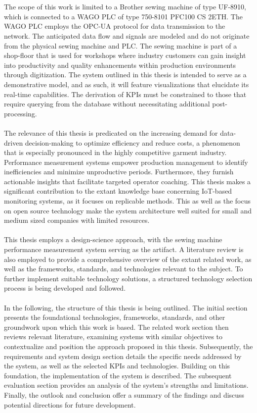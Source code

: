 \\\\
The scope of this work is limited to a Brother sewing machine of type UF-8910, which is connected to a WAGO PLC of type 750-8101 PFC100 CS 2ETH. The WAGO PLC employs the OPC-UA protocol for data transmission to the network. The anticipated data flow and signals are modeled and do not originate from the physical sewing machine and PLC. The sewing machine is part of a shop-floor that is used for workshops where industry customers can gain insight into productivity and quality enhancements within production environments through digitization. The system outlined in this thesis is intended to serve as a demonstrative model, and as such, it will feature visualizations that elucidate its real-time capabilities. The derivation of KPIs must be constrained to those that require querying from the database without necessitating additional post-processing.
\\\\
The relevance of this thesis is predicated on the increasing demand for data-driven decision-making to optimize efficiency and reduce costs, a phenomenon that is especially pronounced in the highly competitive garment industry. Performance measurement systems empower production management to identify inefficiencies and minimize unproductive periods. Furthermore, they furnish actionable insights that facilitate targeted operator coaching. This thesis makes a significant contribution to the extant knowledge base concerning IoT-based monitoring systems, as it focuses on replicable methods. This as well as the focus on open source technology make the system architecture well suited for small and medium sized companies with limited resources.
\\\\
This thesis employs a design-science approach, with the sewing machine performance measurement system serving as the artifact. A literature review is also employed to provide a comprehensive overview of the extant related work, as well as the frameworks, standards, and technologies relevant to the subject. To further implement suitable technology solutions, a structured technology selection process is being developed and followed.
\\\\
In the following, the structure of this thesis is being outlined. The initial section presents the foundational technologies, frameworks, standards, and other groundwork upon which this work is based. The related work section then reviews relevant literature, examining systems with similar objectives to contextualize and position the approach proposed in this thesis. Subsequently, the requirements and system design section details the specific needs addressed by the system, as well as the selected KPIs and technologies. Building on this foundation, the implementation of the system is described. The subsequent evaluation section provides an analysis of the system’s strengths and limitations. Finally, the outlook and conclusion offer a summary of the findings and discuss potential directions for future development.


